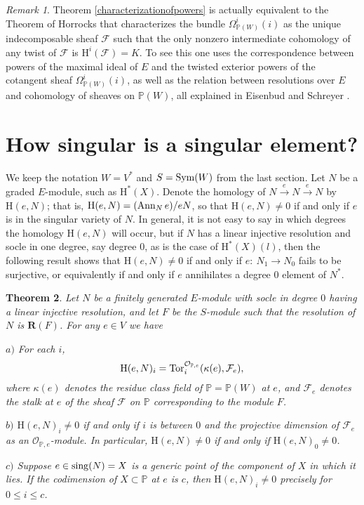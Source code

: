 \documentclass{tran-l}
\newtheorem{theorem}{Theorem}[section]
\theoremstyle{definition}
\theoremstyle{remark}
\newtheorem{remark}[theorem]{Remark}
\newcommand{\PP}{{\mathbb{P}}}
\newcommand{\RR}{{\mathbf{R}}}
\newcommand{\F}{{\mathcal{F}}}
\newcommand{\Ocal}{{\mathcal{O}}}
\newcommand{\sing}{\mathop{\rm sing}\nolimits}
\newcommand{\ann}{\mathop{\rm Ann}\nolimits}
\newcommand{\Tor}{\mathop{\rm Tor}\nolimits}
\newcommand{\rH}{{\mathrm H}}
\newcommand{\Sym}{\mathop{\rm Sym}\nolimits}
\begin{document}
\begin{remark}\label{horrocks} 
Theorem \ref{characterizationofpowers} is 
actually equivalent to 
the Theorem of Horrocks that characterizes the bundle
$\Omega_{\PP(W)}^i(i)$ as the unique indecomposable sheaf ${\mathcal F}$ 
such that the only nonzero intermediate
cohomology of any twist of ${\mathcal F}$ is $\rH^i({\mathcal F})=K$.
To see this one uses the correspondence between powers of
the maximal ideal of $E$ and the twisted exterior powers of
the cotangent sheaf $\Omega_{\PP(W)}^i(i)$, as well as the relation
between resolutions over $E$ and cohomology of sheaves on
$\PP(W)$, all explained in  Eisenbud and Schreyer \cite{ES}.
\end{remark}





\section{How singular is a singular element?}\label{localsys} 

We keep the notation $W=V^*$ and $S=\Sym(W)$ from the last
section. Let $N$ be a graded $E$-module, such as $\rH^*(X)$.  Denote
the homology of $N\xrightarrow{e}N\xrightarrow{e}N$ by $\rH(e,N)$; that is,
$\rH(e,N)=(\ann_N e)/eN$, so that $\rH(e,N)\neq 0$ if and only if $e$ is
in the singular variety of $N$. In general, it is not easy to say in
which degrees the homology $\rH(e,N)$ will occur, but if $N$ has a
linear injective resolution and socle in one degree, say degree $0$, as
is the case of $\rH^*(X)(l)$, then the following result shows that
$\rH(e,N)\neq 0$ if and only if $e:\ N_1\to N_0$ fails to be
surjective, or equivalently if and only if $e$ annihilates a degree $0$
element of $N^*$.

\begin{theorem}\label{singularvectorsofastandardmodule} 
Let $N$ be a finitely generated $E$-module with socle in degree $0$
having a linear injective resolution, and let $F$ be the 
 $S$-module such that the resolution of $N$ is $\RR(F)$. For
any $e\in V$ we have

{$a)$} For each $i$,
\[
\rH(e,N)_i=\Tor^{\Ocal_{\PP,e}}_i(\kappa(e),\F_e),
\] where $\kappa(e)$ denotes the residue class field of $\PP=\PP(W)$ at
$e$, and $\F_e$ denotes the stalk at $e$ of the sheaf $\F$ on $\PP$
corresponding to the module $F$.  

{$b)$} $\rH(e,N)_i\neq 0$ if and
only if $i$ is between $0$ and the projective dimension of $\F_e$ as
an $\Ocal_{\PP,e}$-module.  In particular, $\rH(e,N)\neq 0$ if and only if
$\rH(e,N)_0\neq 0$.  

{$c)$} Suppose $e\in \sing(N)=X$ is a generic
point of the component of $X$ in which it lies.  If the codimension of
$X\subset \PP$ at $e$ is $c$, then $\rH(e,N)_i\neq 0$ precisely for
$0\leq i\leq c$.\end{theorem}
\end{document}

